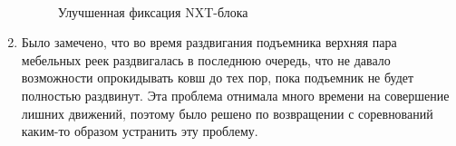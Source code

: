 \begin{enumerate}
	\begin{figure}[H]
		\begin{minipage}[h]{0.2\linewidth}
			\center  
		\end{minipage}
		\begin{minipage}[h]{0.6\linewidth}
			\caption{Улучшенная фиксация NXT-блока}
		\end{minipage}
	\end{figure}
	
	\item Было замечено, что во время раздвигания подъемника верхняя пара мебельных реек раздвигалась в последнюю очередь, что не давало возможности опрокидывать ковш до тех пор, пока подъемник не будет полностью раздвинут. Эта проблема отнимала много времени на совершение лишних движений, поэтому было решено по возвращении с соревнований каким-то образом устранить эту проблему.
	
\end{enumerate}
\fillpage